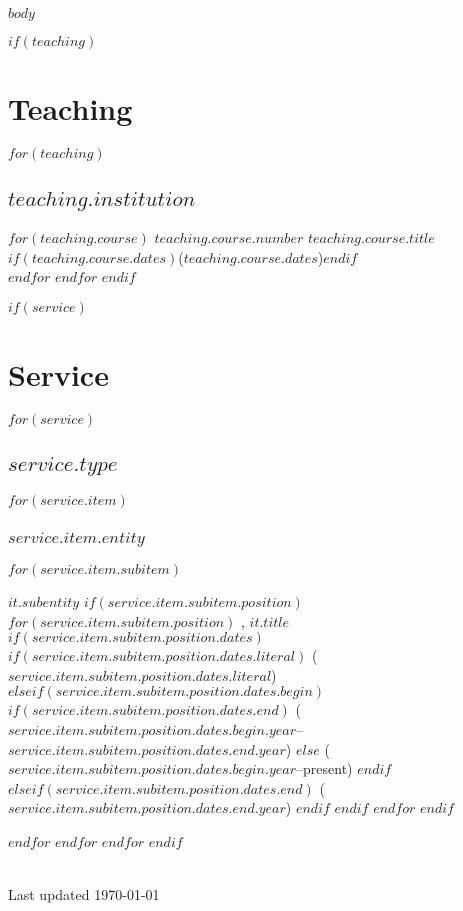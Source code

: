 \documentclass[11pt]{article}
\begin{document}
$body$
\vspace{10pt}

$if(teaching)$
  \section{Teaching}
  $for(teaching)$
    \subsection{$teaching.institution$}
    $for(teaching.course)$
      {\footnotesize $teaching.course.number$}
      \emph{$teaching.course.title$}
      $if(teaching.course.dates)${\small ($teaching.course.dates$)}$endif$\\
    $endfor$
  $endfor$
$endif$

$if(service)$
  \section{Service}
  $for(service)$
    \subsection{$service.type$}
    $for(service.item)$
      \subsubsection*{$service.item.entity$}
      $for(service.item.subitem)$
      \begin{adjustwidth}{1em}{0em}
      \emph{$it.subentity$}\ignorespaces
        $if(service.item.subitem.position)$
          $for(service.item.subitem.position)$
          {\small, $it.title$}
            $if(service.item.subitem.position.dates)$
	      $if(service.item.subitem.position.dates.literal)$
                {\small($service.item.subitem.position.dates.literal$)}\ignorespaces
              $elseif(service.item.subitem.position.dates.begin)$
                $if(service.item.subitem.position.dates.end)$
                  {\small($service.item.subitem.position.dates.begin.year$--$service.item.subitem.position.dates.end.year$)}\ignorespaces
	        $else$
	          {\small($service.item.subitem.position.dates.begin.year$--present)}\ignorespaces
		$endif$
              $elseif(service.item.subitem.position.dates.end)$
                {\small($service.item.subitem.position.dates.end.year$)}\ignorespaces
              $endif$
            $endif$
          $endfor$
	$endif$\\
	[-.5cm]
      \end{adjustwidth}
      $endfor$
      \vspace{.1cm}
    $endfor$
  $endfor$
$endif$

\vfill
\hrulefill\\
\footnotesize{Last updated \today}
\end{document}
